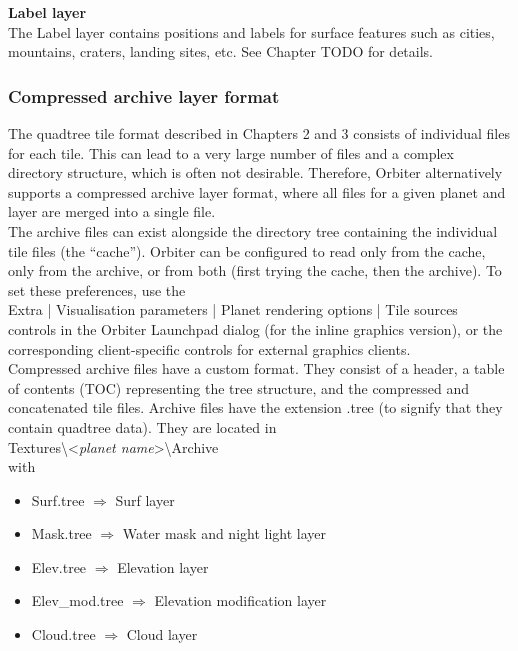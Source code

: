 \documentclass[Orbiter Developer Manual.tex]{subfiles}
\begin{document}
\noindent
\textbf{Label layer}\\
The Label layer contains positions and labels for surface features such as cities, mountains, craters, landing sites, etc. See Chapter TODO for details.


\subsubsection{Compressed archive layer format}
The quadtree tile format described in Chapters 2 and 3 consists of individual files for each tile. This can lead to a very large number of files and a complex directory structure, which is often not desirable. Therefore, Orbiter alternatively supports a compressed archive layer format, where all files for a given planet and layer are merged into a single file.\\
The archive files can exist alongside the directory tree containing the individual tile files (the “cache”). Orbiter can be configured to read only from the cache, only from the archive, or from both (first trying the cache, then the archive). To set these preferences, use the\\
\indent Extra | Visualisation parameters | Planet rendering options | Tile sources\\
controls in the Orbiter Launchpad dialog (for the inline graphics version), or the corresponding client-specific controls for external graphics clients.\\
Compressed archive files have a custom format. They consist of a header, a table of contents (TOC) representing the tree structure, and the compressed and concatenated tile files. Archive files have the extension .tree (to signify that they contain quadtree data). They are located in\\
\indent Textures\textbackslash <\textit{planet name}>\textbackslash Archive\\
with

\begin{itemize}
\item Surf.tree $\Rightarrow$ Surf layer
\item Mask.tree $\Rightarrow$ Water mask and night light layer
\item Elev.tree $\Rightarrow$ Elevation layer
\item Elev\_mod.tree $\Rightarrow$ Elevation modification layer
\item Cloud.tree $\Rightarrow$ Cloud layer
\end{itemize}
\end{document}
